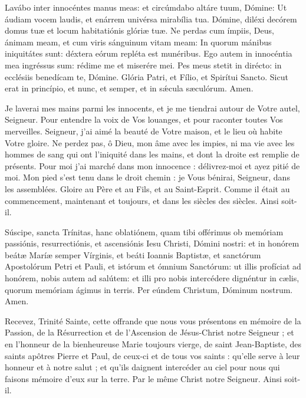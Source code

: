 \documentclass[twoside]{article}
\begin{document}
\begin{paracol}{2}
\switchcolumn*

Lavábo inter innocéntes manus meas: et circúmdabo altáre tuum, Dómine: Ut áudiam vocem laudis, et enárrem univérsa mirabília tua. Dómine, diléxi decórem domus tuæ et locum habitatiónis glóriæ tuæ. Ne perdas cum ímpiis, Deus, ánimam meam, et cum viris sánguinum vitam meam: In quorum mánibus iniquitátes sunt: déxtera eórum repléta est munéribus. Ego autem in innocéntia mea ingréssus sum: rédime me et miserére mei. Pes meus stetit in dirécto: in ecclésiis benedícam te, Dómine.
Glória Patri, et Fílio, et Spirítui Sancto. Sicut erat in princípio, et nunc, et semper, et in sǽcula sæculórum. Amen.

\switchcolumn

Je laverai mes mains parmi les innocents, et je me tiendrai autour de Votre autel, Seigneur. Pour entendre la voix de Vos louanges, et pour raconter toutes Vos merveilles. Seigneur, j'ai aimé la beauté de Votre maison, et le lieu où habite Votre gloire. Ne perdez pas, ô Dieu, mon âme avec les impies, ni ma vie avec les hommes de sang qui ont l'iniquité dans les mains, et dont la droite est remplie de présents. Pour moi j'ai marché dans mon innocence : délivrez-moi et ayez pitié de moi. Mon pied s’est tenu dans le droit chemin : je Vous bénirai, Seigneur, dans les assemblées. Gloire au Père et au Fils, et au Saint-Esprit. Comme il était au commencement, maintenant et toujours, et dans les siècles des siècles. Ainsi soit-il.

\switchcolumn*

Súscipe, sancta Trínitas, hanc oblatiónem, quam tibi offérimus ob memóriam passiónis, resurrectiónis, et ascensiónis Iesu Christi, Dómini nostri: et in honórem beátæ Maríæ semper Vírginis, et beáti Ioannis Baptistæ, et sanctórum Apostolórum Petri et Pauli, et istórum et ómnium Sanctórum: ut illis profíciat ad honórem, nobis autem ad salútem: et illi pro nobis intercédere dignéntur in cælis, quorum memóriam ágimus in terris. Per eúndem Christum, Dóminum nostrum. Amen.

\switchcolumn

Recevez, Trinité Sainte, cette offrande que nous vous présentons en mémoire de la Passion, de la Résurrection et de l’Ascension de Jésus-Christ notre Seigneur ; et en l’honneur de la bienheureuse Marie toujours vierge, de saint Jean-Baptiste, des saints apôtres Pierre et Paul, de ceux-ci et de tous vos saints : qu’elle serve à leur honneur et à notre salut ; et qu’ils daignent intercéder au ciel pour nous qui faisons mémoire d’eux sur la terre. Par le même Christ notre Seigneur. Ainsi soit-il.

\end{paracol}
\newpage
\end{document}
